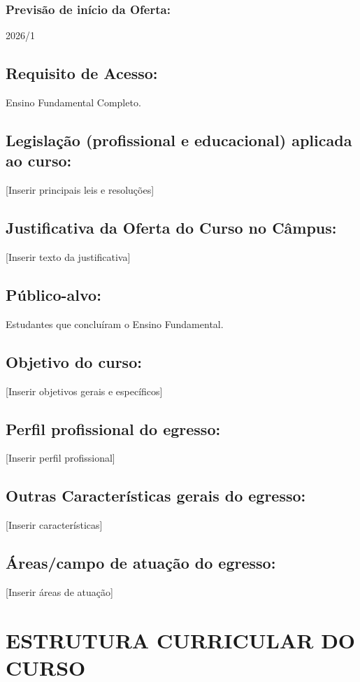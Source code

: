 \documentclass{ifsc-ppc}
\begin{document}
\subsubsection{Previsão de início da Oferta:}
2026/1

\subsection{Requisito de Acesso:}
Ensino Fundamental Completo.

\subsection{Legislação (profissional e educacional) aplicada ao curso:}
[Inserir principais leis e resoluções]

\subsection{Justificativa da Oferta do Curso no Câmpus:}
[Inserir texto da justificativa]

\subsection{Público-alvo:}
Estudantes que concluíram o Ensino Fundamental.

\subsection{Objetivo do curso:}
[Inserir objetivos gerais e específicos]

\subsection{Perfil profissional do egresso:}
[Inserir perfil profissional]

\subsection{Outras Características gerais do egresso:}
[Inserir características]

\subsection{Áreas/campo de atuação do egresso:}
[Inserir áreas de atuação]

\section{ESTRUTURA CURRICULAR DO CURSO}
\end{document}
